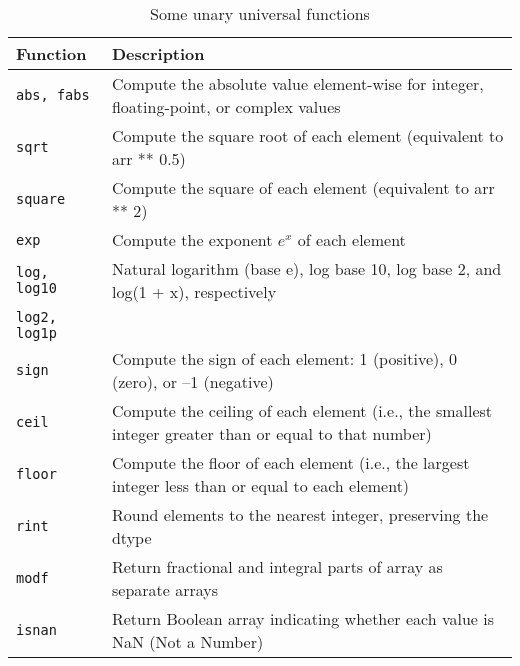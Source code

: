 \begin{table}
    \caption{Some unary universal functions}
    \label{Some unary universal functions}
    \begin{tabularx}{\textwidth}{lX}
        \hline
        Function               & Description                                                                                                 \\
        \hline
        \verb|abs, fabs|       & Compute the absolute value element-wise for integer, floating-point, or complex values                      \\
        \verb|sqrt|            & Compute the square root of each element (equivalent to arr ** 0.5)                                          \\
        \verb|square|          & Compute the square of each element (equivalent to arr ** 2)                                                 \\
        \verb|exp|             & Compute the exponent $e^x$ of each element                                                                  \\
        \verb|log, log10|      & Natural logarithm (base e), log base 10, log base 2, and log(1 + x), respectively                           \\
        \verb|log2, log1p|     &                                                                                                             \\
        \verb|sign|            & Compute the sign of each element: 1 (positive), 0 (zero), or –1 (negative)                                  \\
        \verb|ceil|            & Compute the ceiling of each element (i.e., the smallest integer greater than or equal to that number)       \\
        \verb|floor|           & Compute the floor of each element (i.e., the largest integer less than or equal to each element)            \\
        \verb|rint|            & Round elements to the nearest integer, preserving the dtype                                                 \\
        \verb|modf|            & Return fractional and integral parts of array as separate arrays                                            \\
        \verb|isnan|           & Return Boolean array indicating whether each value is NaN (Not a Number)                                    \\

\end{tabularx}
\end{table}

